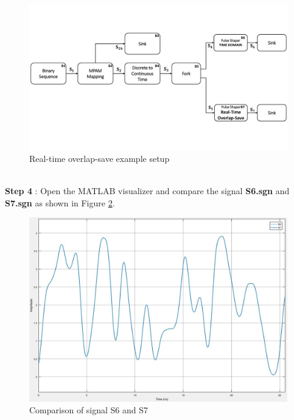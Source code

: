 \begin{figure}[h]
	\centering
	\includegraphics[width=12cm]{./algorithms/overlap_save/figures/realTimeOverlapSave.pdf}
	\caption{Real-time overlap-save example setup}\label{realTimeOverlapSave}
\end{figure}\\
\textbf{Step 4} : Open the MATLAB visualizer and compare the signal \textbf{S6.sgn} and \textbf{S7.sgn} as shown in Figure \ref{S6S7}.
\begin{figure}[h]
	\centering
	\includegraphics[width=12cm]{./algorithms/overlap_save/figures/S6_S7.jpg}
	\caption{Comparison of signal S6 and S7}\label{S6S7}
\end{figure}



